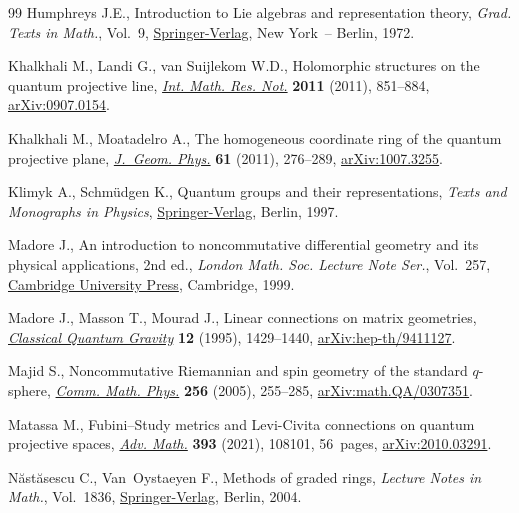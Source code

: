 \begin{thebibliography}{99}
Humphreys J.E., Introduction to {L}ie algebras and representation theory,
 \textit{Grad. Texts in Math.}, Vol.~9, \href{https://doi.org/10.1007/978-1-4612-6398-2}{Springer-Verlag}, New York~-- Berlin,
 1972.

Khalkhali M., Landi G., van Suijlekom W.D., Holomorphic structures on the
 quantum projective line, \href{https://doi.org/10.1093/imrn/rnq097}{\textit{Int. Math. Res. Not.}} \textbf{2011} (2011),
 851--884, \href{https://arxiv.org/abs/0907.0154}{arXiv:0907.0154}.

Khalkhali M., Moatadelro A., The homogeneous coordinate ring of the quantum
 projective plane, \href{https://doi.org/10.1016/j.geomphys.2010.09.014}{\textit{J.~Geom. Phys.}} \textbf{61} (2011), 276--289,
 \href{https://arxiv.org/abs/1007.3255}{arXiv:1007.3255}.

Klimyk A., Schm\"{u}dgen K., Quantum groups and their representations, \textit{Texts
 and Monographs in Physics}, \href{https://doi.org/10.1007/978-3-642-60896-4}{Springer-Verlag}, Berlin, 1997.

Madore J., An introduction to noncommutative differential geometry and its
 physical applications, 2nd ed., \textit{London Math. Soc. Lecture Note Ser.}, Vol.~257, \href{https://doi.org/10.1017/CBO9780511569357}{Cambridge University Press}, Cambridge, 1999.

Madore J., Masson T., Mourad J., Linear connections on matrix geometries,
 \href{https://doi.org/10.1088/0264-9381/12/6/009}{\textit{Classical Quantum Gravity}} \textbf{12} (1995), 1429--1440,
 \href{https://arxiv.org/abs/hep-th/9411127}{arXiv:hep-th/9411127}.

Majid S., Noncommutative {R}iemannian and spin geometry of the standard
 {$q$}-sphere, \href{https://doi.org/10.1007/s00220-005-1295-8}{\textit{Comm. Math. Phys.}} \textbf{256} (2005), 255--285,
 \href{https://arxiv.org/abs/math.QA/0307351}{arXiv:math.QA/0307351}.

Matassa M., Fubini--{S}tudy metrics and {L}evi-{C}ivita connections on quantum
 projective spaces, \href{https://doi.org/10.1016/j.aim.2021.108101}{\textit{Adv. Math.}} \textbf{393} (2021), 108101, 56~pages,
 \href{https://arxiv.org/abs/2010.03291}{arXiv:2010.03291}.

N\u{a}st\u{a}sescu C., Van~Oystaeyen F., Methods of graded rings,
 \textit{Lecture Notes in Math.}, Vol.~1836, \href{https://doi.org/10.1007/b94904}{Springer-Verlag}, Berlin, 2004.


\end{thebibliography}
